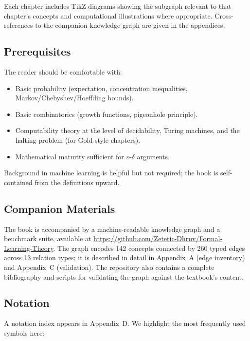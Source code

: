 \documentclass[11pt,a4paper,twoside,openright]{book}
\theoremstyle{definition}
\theoremstyle{plain}
\theoremstyle{remark}
\begin{document}
Each chapter includes TikZ diagrams showing the subgraph relevant to that chapter's concepts and computational illustrations where appropriate.  Cross-references to the companion knowledge graph are given in the appendices.

\subsection*{Prerequisites}

The reader should be comfortable with:
\begin{itemize}[leftmargin=*]
\item Basic probability (expectation, concentration inequalities, Markov/Chebyshev/Hoeffding bounds).
\item Basic combinatorics (growth functions, pigeonhole principle).
\item Computability theory at the level of decidability, Turing machines, and the halting problem (for Gold-style chapters).
\item Mathematical maturity sufficient for $\varepsilon$-$\delta$ arguments.
\end{itemize}

Background in machine learning is helpful but not required; the book is self-contained from the definitions upward.

\subsection*{Companion Materials}

The book is accompanied by a machine-readable knowledge graph and a benchmark suite, available at \url{https://github.com/Zetetic-Dhruv/Formal-Learning-Theory}.  The graph encodes 142 concepts connected by 260 typed edges across 13 relation types; it is described in detail in Appendix~A (edge inventory) and Appendix~C (validation).  The repository also contains a complete bibliography and scripts for validating the graph against the textbook's content.

\subsection*{Notation}

A notation index appears in Appendix~D. We highlight the most frequently used symbols here:
\end{document}
